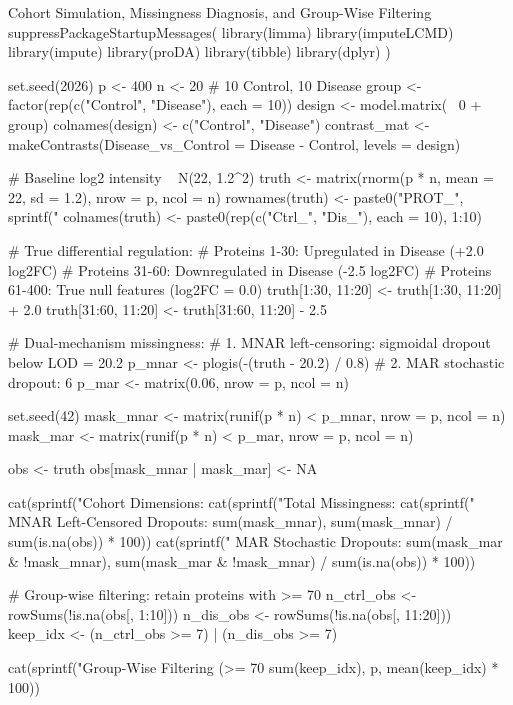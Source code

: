 \documentclass[11pt,oneside]{book}
\begin{document}
\begin{rchunk}{Cohort Simulation, Missingness Diagnosis, and Group-Wise Filtering}
suppressPackageStartupMessages({
  library(limma)
  library(imputeLCMD)
  library(impute)
  library(proDA)
  library(tibble)
  library(dplyr)
})

set.seed(2026)
p <- 400
n <- 20 # 10 Control, 10 Disease
group <- factor(rep(c("Control", "Disease"), each = 10))
design <- model.matrix(~ 0 + group)
colnames(design) <- c("Control", "Disease")
contrast_mat <- makeContrasts(Disease_vs_Control = Disease - Control, levels = design)

# Baseline log2 intensity ~ N(22, 1.2^2)
truth <- matrix(rnorm(p * n, mean = 22, sd = 1.2), nrow = p, ncol = n)
rownames(truth) <- paste0("PROT_", sprintf("%
colnames(truth) <- paste0(rep(c("Ctrl_", "Dis_"), each = 10), 1:10)

# True differential regulation:
# Proteins 1-30: Upregulated in Disease (+2.0 log2FC)
# Proteins 31-60: Downregulated in Disease (-2.5 log2FC)
# Proteins 61-400: True null features (log2FC = 0.0)
truth[1:30, 11:20]  <- truth[1:30, 11:20] + 2.0
truth[31:60, 11:20] <- truth[31:60, 11:20] - 2.5

# Dual-mechanism missingness:
# 1. MNAR left-censoring: sigmoidal dropout below LOD = 20.2
p_mnar <- plogis(-(truth - 20.2) / 0.8)
# 2. MAR stochastic dropout: 6%
p_mar <- matrix(0.06, nrow = p, ncol = n)

set.seed(42)
mask_mnar <- matrix(runif(p * n) < p_mnar, nrow = p, ncol = n)
mask_mar  <- matrix(runif(p * n) < p_mar,  nrow = p, ncol = n)

obs <- truth
obs[mask_mnar | mask_mar] <- NA

cat(sprintf("Cohort Dimensions: %
cat(sprintf("Total Missingness: %
cat(sprintf("  MNAR Left-Censored Dropouts: %
            sum(mask_mnar), sum(mask_mnar) / sum(is.na(obs)) * 100))
cat(sprintf("  MAR Stochastic Dropouts:    %
            sum(mask_mar & !mask_mnar), sum(mask_mar & !mask_mnar) / sum(is.na(obs)) * 100))

# Group-wise filtering: retain proteins with >= 70%
n_ctrl_obs <- rowSums(!is.na(obs[, 1:10]))
n_dis_obs  <- rowSums(!is.na(obs[, 11:20]))
keep_idx   <- (n_ctrl_obs >= 7) | (n_dis_obs >= 7)

cat(sprintf("Group-Wise Filtering (>= 70%
            sum(keep_idx), p, mean(keep_idx) * 100))


\end{rchunk}
\end{document}
